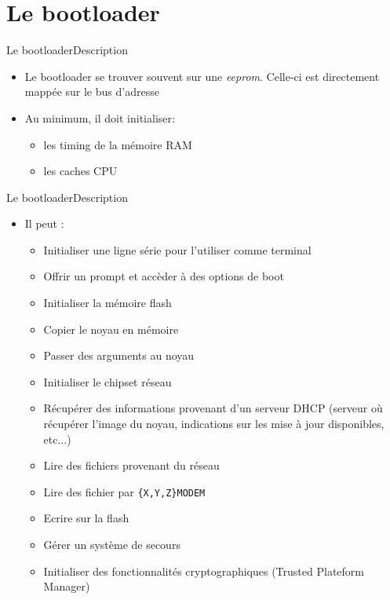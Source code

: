 \section{Le bootloader}

\begin{frame}[fragile=singleslide]{Le bootloader}{Description}
  \begin{itemize}
  \item    Le    bootloader     se    trouver    souvent    sur    une
    \emph{eeprom}.  Celle-ci   est  directement  mappée   sur  le  bus
    d'adresse
  \item Au minimum, il doit initialiser:
    \begin{itemize}
    \item les timing de la mémoire RAM
    \item les caches CPU
    \end{itemize}
  \end{itemize}
\end{frame}

\begin{frame}[fragile=singleslide]{Le bootloader}{Description}
  \begin{itemize}
  \item Il peut :
    \begin{itemize}
    \item Initialiser une ligne série pour l'utiliser comme terminal
    \item Offrir un prompt et accèder à des options de boot
    \item Initialiser la mémoire flash
    \item Copier le noyau en mémoire
    \item Passer des arguments au noyau
    \item Initialiser le chipset réseau
    \item  Récupérer  des  informations  provenant d'un  serveur  DHCP
      (serveur où récupérer l'image du noyau, indications sur les mise
      à jour disponibles, etc...)
    \item Lire des fichiers provenant du réseau
    \item Lire des fichier par \verb+{X,Y,Z}MODEM+
    \item Ecrire sur la flash
    \item Gérer un système de secours
    \item  Initialiser des  fonctionnalités  cryptographiques (Trusted
      Plateform Manager)
    \end{itemize}
  \end{itemize}
\end{frame}

